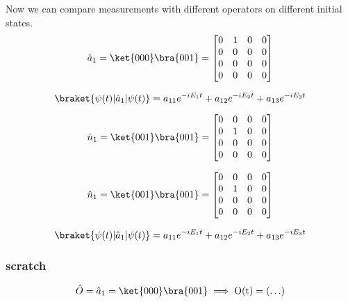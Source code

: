 Now we can compare measurements with different operators on different initial states.
\begin{equation}
    \hat{a}_1 = \ket{000}\bra{001} =
    \begin{bmatrix}
        0 & 1 & 0 & 0 \\
        0 & 0 & 0 & 0 \\
        0 & 0 & 0 & 0 \\
        0 & 0 & 0 & 0 \\
    \end{bmatrix}
\end{equation}

\begin{equation}
    \braket{\psi(t)|\hat{a}_1|\psi(t)} = a_{11} e^{-i E_1 t} + a_{12} e^{-i E_2 t} + a_{13} e^{-i E_3 t}
\end{equation}

\begin{equation}
    \hat{n}_1 = \ket{001}\bra{001} =
    \begin{bmatrix}
        0 & 0 & 0 & 0 \\
        0 & 1 & 0 & 0 \\
        0 & 0 & 0 & 0 \\
        0 & 0 & 0 & 0 \\
    \end{bmatrix}
\end{equation}


\begin{equation}
    \hat{n}_1 = \ket{001}\bra{001} =
    \begin{bmatrix}
        0 & 0 & 0 & 0 \\
        0 & 1 & 0 & 0 \\
        0 & 0 & 0 & 0 \\
        0 & 0 & 0 & 0 \\
    \end{bmatrix}
\end{equation}

\begin{equation}
    \braket{\psi(t)|\hat{a}_1|\psi(t)} = a_{11} e^{-i E_1 t} + a_{12} e^{-i E_2 t} + a_{13} e^{-i E_3 t}
\end{equation}












\subsubsection{scratch}
\begin{equation}
    \hat{O}=\hat{a}_1 = \ket{000}\bra{001} \implies \textrm{O(t)} = \left( \mathellipsis \right)
\end{equation}

